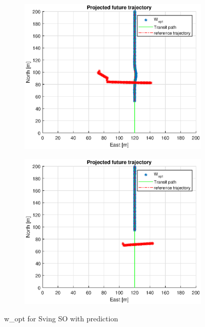 \begin{figure}
\begin{subfigure}[b]{0.499\textwidth}
    \end{subfigure}
    \hfill
    \\
    \begin{subfigure}[b]{0.49\textwidth}
        \centering
        \includegraphics[width=\textwidth]{Images/Figures/sving_SO/Simple0_f999_Frame3}
    \end{subfigure}
    \hfill
    \begin{subfigure}[b]{0.499\textwidth}
        \centering
        \includegraphics[width=\textwidth]{Images/Figures/sving_SO/Simple0_f999_Frame4}
    \end{subfigure}
    \caption{w\_opt for Sving SO with prediction}
\end{figure}

